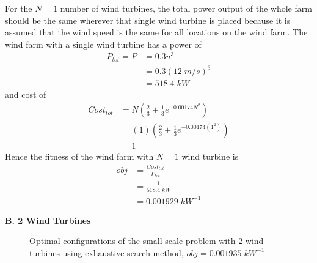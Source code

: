         For the $N=1$ number of wind turbines, the total power output of the whole farm should be the same wherever that single wind turbine is placed because it is assumed that the wind speed is the same for all locations on the wind farm. The wind farm with a single wind turbine has a power of
        \begin{align*}
            P_{tot}=P
            &= 0.3u^3 \\
            &= 0.3(12\;m/s)^3\\
            &= 518.4 \;kW
        \end{align*}
        and cost of
        \begin{align*}
            Cost_{tot}
            &= N\left(\frac{2}{3} + \frac{1}{3}e^{-0.00174N^2}\right) \\
            &= \left(1\right)\left(\frac{2}{3} + \frac{1}{3}e^{-0.00174\left(1^2\right)}\right) \\
            &= 1
        \end{align*}
        Hence the fitness of the wind farm with $N=1$ wind turbine is
        \begin{align*}
            obj
            &= \frac{Cost_{tot}}{P_{tot}} \\
            &= \frac{1}{518.4 \;kW} \\
            &= 0.001929\; kW^{-1}
        \end{align*}
    
    \textbf{B. 2 Wind Turbines}
    	\begin{figure}[H]
            \centering
            \qquad
            \caption{Optimal configurations of the small scale problem with 2 wind turbines using exhaustive search method, $obj=0.001935\;kW^{-1}$}
        \end{figure}
    
